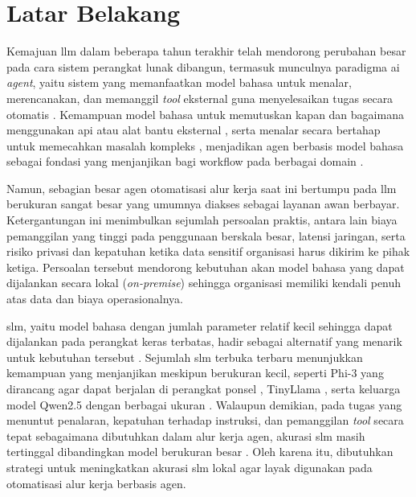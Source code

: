 \section{Latar Belakang}
Kemajuan \gls{llm} dalam beberapa tahun terakhir telah mendorong perubahan besar pada cara sistem perangkat lunak dibangun, termasuk munculnya paradigma \gls{ai} \textit{agent}, yaitu sistem yang memanfaatkan model bahasa untuk menalar, merencanakan, dan memanggil \textit{tool} eksternal guna menyelesaikan tugas secara otomatis \citep{minaee2024llmsurvey, wang2024agentsurvey}. Kemampuan model bahasa untuk memutuskan kapan dan bagaimana menggunakan \gls{api} atau alat bantu eksternal \citep{schick2023toolformer}, serta menalar secara bertahap untuk memecahkan masalah kompleks \citep{yao2023tot}, menjadikan agen berbasis model bahasa sebagai fondasi yang menjanjikan bagi \gls{workflow} pada berbagai domain \citep{park2023generativeagents}.

Namun, sebagian besar agen otomatisasi alur kerja saat ini bertumpu pada \gls{llm} berukuran sangat besar yang umumnya diakses sebagai layanan awan berbayar. Ketergantungan ini menimbulkan sejumlah persoalan praktis, antara lain biaya pemanggilan yang tinggi pada penggunaan berskala besar, latensi jaringan, serta risiko privasi dan kepatuhan ketika data sensitif organisasi harus dikirim ke pihak ketiga. Persoalan tersebut mendorong kebutuhan akan model bahasa yang dapat dijalankan secara lokal (\textit{on-premise}) sehingga organisasi memiliki kendali penuh atas data dan biaya operasionalnya.

\gls{slm}, yaitu model bahasa dengan jumlah parameter relatif kecil sehingga dapat dijalankan pada perangkat keras terbatas, hadir sebagai alternatif yang menarik untuk kebutuhan tersebut \citep{wang2025slmsurvey}. Sejumlah \gls{slm} terbuka terbaru menunjukkan kemampuan yang menjanjikan meskipun berukuran kecil, seperti Phi-3 yang dirancang agar dapat berjalan di perangkat ponsel \citep{abdin2024phi3}, TinyLlama \citep{zhang2024tinyllama}, serta keluarga model Qwen2.5 dengan berbagai ukuran \citep{qwen2024qwen25}. Walaupun demikian, pada tugas yang menuntut penalaran, kepatuhan terhadap instruksi, dan pemanggilan \textit{tool} secara tepat sebagaimana dibutuhkan dalam alur kerja agen, akurasi \gls{slm} masih tertinggal dibandingkan model berukuran besar \citep{wang2025slmsurvey}. Oleh karena itu, dibutuhkan strategi untuk meningkatkan akurasi \gls{slm} lokal agar layak digunakan pada otomatisasi alur kerja berbasis agen.

